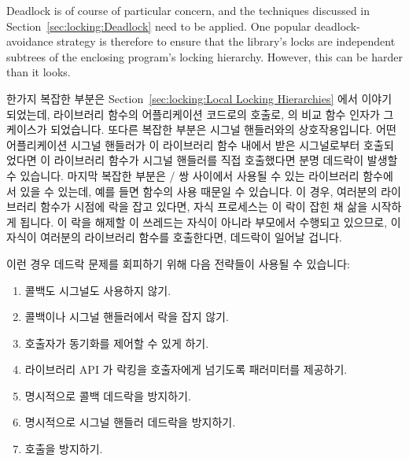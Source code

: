 Deadlock is of course of particular concern, and the techniques discussed
in Section~\ref{sec:locking:Deadlock} need to be applied.
One popular deadlock-avoidance strategy is therefore to ensure that
the library's locks are independent subtrees of the enclosing program's
locking hierarchy.
However, this can be harder than it looks.

\fi

한가지 복잡한 부분은
Section~\ref{sec:locking:Local Locking Hierarchies}
에서 이야기 되었는데, 라이브러리 함수의 어플리케이션 코드로의 호출로,
 의 비교 함수 인자가 그 케이스가 되었습니다.
또다른 복잡한 부분은 시그널 핸들러와의 상호작용입니다.
어떤 어플리케이션 시그널 핸들러가 이 라이브러리 함수 내에서 받은 시그널로부터
호출되었다면 이 라이브러리 함수가 시그널 핸들러를 직접 호출했다면 분명 데드락이
발생할 수 있습니다.
마지막 복잡한 부분은 / 쌍 사이에서 사용될 수 있는
라이브러리 함수에서 있을 수 있는데, 예를 들면  함수의 사용 때문일
수 있습니다.
이 경우, 여러분의 라이브러리 함수가  시점에 락을 잡고 있다면, 자식
프로세스는 이 락이 잡힌 채 삶을 시작하게 됩니다.
이 락을 해제할 이 쓰레드는 자식이 아니라 부모에서 수행되고 있으므로, 이 자식이
여러분의 라이브러리 함수를 호출한다면, 데드락이 일어날 겁니다.

이런 경우 데드락 문제를 회피하기 위해 다음 전략들이 사용될 수 있습니다:

\begin{enumerate}
\item	콜백도 시그널도 사용하지 않기.
\item	콜백이나 시그널 핸들러에서 락을 잡지 않기.
\item	호출자가 동기화를 제어할 수 있게 하기.
\item	라이브러리 API 가 락킹을 호출자에게 넘기도록 패러미터를 제공하기.
\item	명시적으로 콜백 데드락을 방지하기.
\item	명시적으로 시그널 핸들러 데드락을 방지하기.
\item	{} 호출을 방지하기.
\end{enumerate}

